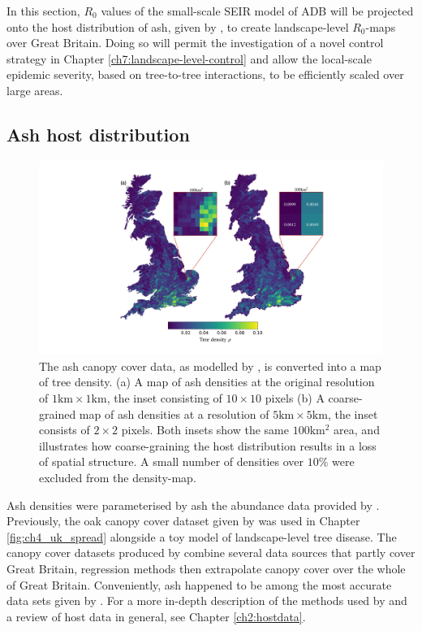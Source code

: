 \label{sec:r0-map-construct}
In this section, $R_0$ values of the small-scale SEIR model of ADB will be projected onto the host distribution of ash, 
given by \cite{hill.data}, to create landscape-level $R_0$-maps over Great Britain. 
Doing so will permit the investigation of a novel control strategy in Chapter \ref{ch7:landscape-level-control} 
and allow the local-scale epidemic severity, based on tree-to-tree interactions, to be efficiently scaled over large areas.

\subsection{Ash host distribution}

\begin{figure}
    \centering
    \includegraphics[scale=0.45]{chapter6/figures/fig-ash-data.pdf}
    \caption{The ash canopy cover data, as modelled by \cite{hill.data}, is converted into a map of tree density. (a) A map of ash densities at the original resolution of $1\mathrm{km} \times 1\mathrm{km}$, the inset consisting of $10\times 10$ pixels (b) A coarse-grained map of ash densities at a resolution of $5\mathrm{km} \times 5\mathrm{km}$, the inset consists of $2 \times 2$ pixels. Both insets show the same $100\mathrm{km^2}$ area, and illustrates how coarse-graining the host distribution results in a loss of spatial structure. A small number of densities over $10\%$ were excluded from the density-map.}
    \label{fig:ash-host-data}
\end{figure}

Ash densities were parameterised by ash the abundance data provided by \cite{hill.data}. 
Previously, the oak canopy cover dataset given by \cite{hill.data} was used in Chapter \ref{fig:ch4_uk_spread} 
alongside a toy model of landscape-level tree disease. The canopy cover datasets produced by \cite{hill.data} combine
several data sources that partly cover Great Britain, regression methods then extrapolate canopy cover over the whole of Great Britain.
Conveniently, ash happened to be among the most accurate data sets given by \cite{hill.data}. 
For a more in-depth description of the methods used by \cite{hill.data} and a review of host data in general, see Chapter \ref{ch2:hostdata}.

